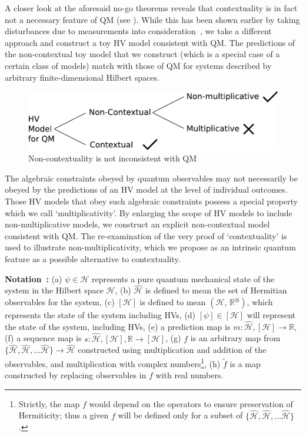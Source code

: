 \documentclass[british,aps,prl,superscriptaddress,nofootinbib,times,reprint]{revtex4-1}
\theoremstyle{plain}
\theoremstyle{definition}
\theoremstyle{remark}
\theoremstyle{plain}
\theoremstyle{plain}
\theoremstyle{plain}
\theoremstyle{definition}
\theoremstyle{definition}
\begin{document}
A closer look at the aforesaid no-go theorems
reveals that contextuality is in fact not a
necessary feature of QM (see ).
While this has been shown earlier by taking
disturbances due to measurements into
consideration~\cite{NoContextuality,LaCourNoCntx},
we take a different approach and construct a toy
HV model consistent with QM.  The predictions of
the non-contextual toy model that we construct
(which is a special case of a certain class of
models) match with those of QM for systems
described by arbitrary finite-dimensional Hilbert
spaces.  \begin{figure}[h]
\includegraphics[width=\columnwidth]{block1}
\caption{Non-contextuality is not inconsistent
with QM} \label{fig:block}\end{figure} The
algebraic constraints obeyed by quantum
observables may not necessarily be obeyed by the
predictions of an HV model at the level of
individual outcomes.  Those HV models that obey
such algebraic constraints possess a special
property which we call `multiplicativity'.  By
enlarging the scope of HV models to include
non-multiplicative models, we construct an
explicit non-contextual model consistent with QM.
The re-examination of the very proof of
`contextuality'  is used to illustrate
non-multiplicativity, which we propose as an
intrinsic quantum feature as a possible
alternative to contextuality. 


{\noindent \bf Notation~:} (a) $\psi\in\mathcal{H}$ 
represents a pure quantum mechanical
state of the system in the Hilbert space
$\mathcal{H}$, (b) $\hat{\mathcal{H}}$ is defined
to mean the set of Hermitian 
observables for the system, (c)
$[\mathcal{H}]$ is defined to mean
$(\mathcal{H},\,\mathbb{R}^{\otimes})$, which
represents the state of the system including HVs,
(d) $[\psi]\in[\mathcal{H}]$ will represent the
state of the system, including HVs, (e) a
prediction map is
$m:\hat{\mathcal{H}},[\mathcal{H}]\to\mathbb{R}$,
(f) a sequence map is
$s:\hat{\mathcal{H}},[\mathcal{H}],\mathbb{R}\to[\mathcal{H}]$,
(g) $f$ is an arbitrary map from $\{
\hat{\mathcal{H}},\hat{\mathcal{H}},\dots\hat{\mathcal{H}}
\} \to \hat{\mathcal{H}}$ constructed using
multiplication and addition of the observables,
and multiplication with complex
numbers\footnote{Strictly, the map $f$ would
depend on the operators to ensure preservation of
Hermiticity; thus a given $f$ will be defined only
for a subset of $\{
\hat{\mathcal{H}},\hat{\mathcal{H}},\dots\hat{\mathcal{H}}
\}$.}, (h) $\tilde{f}$ is a map constructed by
replacing observables in $f$ with real numbers.
\end{document}
